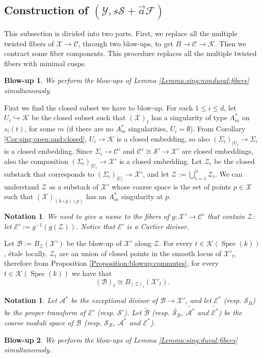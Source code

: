 \documentclass[11pt]{amsart}
\newcommand{\sC}{\mathscr{C}}
\newcommand{\sF}{\mathscr{F}}
\newcommand{\sA}{\mathscr{A}}
\newcommand{\sB}{\mathscr{B}}
\newcommand{\sE}{\mathscr{E}}
\newcommand{\sS}{\mathscr{S}}
\newcommand{\sX}{\mathscr{X}}
\newcommand{\sZ}{\mathscr{Z}}
\newcommand{\spec}{\operatorname{Spec}}
\newcommand{\Kg}{\mathcal{K}}
\newcommand{\sY}{\mathscr{Y}}
\newtheorem{Notation}[theorem]{Notation}
\newtheorem{Step_1}{Blow-up}
\theoremstyle{definition}
\begin{document}
\subsection{Construction of $(\sY,s\sS+\vec{a}\sF) $}\label{subsection:construction:family:of:surfaces} 
 This subsection is divided into two parts. First, we replace all the multiple twisted fibers of $\sX \to \sC$, through two
 blow-ups, to get $B \to \sC \to \Kg$. Then we contract some fiber components. This procedure replaces all the multiple twisted fibers with minimal cusps.
  
 \begin{Step_1}
  We perform the blow-ups of Lemma \ref{Lemma:sing:nonduval:fibers} simultaneously.
 \end{Step_1}

 First we find the closed subset we have to blow-up.
 For each $1 \le i \le d$, let $U_i \hookrightarrow \Kg$ be the closed subset such that $(\sX)_t$ has a singularity of type $A_m^*$ on $s_i(t)$,
 for some $m$ (if there are no $A_m^*$ singularities, $U_i=\emptyset$).
 From Corollary \ref{Cor:sing:open:and:closed},
 $U_i \to \Kg$ is a closed embedding, so also $(\Sigma_i)_{|U_i} \to \Sigma_i$ is a closed embedding. Since $\Sigma_i \to \sC'$ and
 $\sC' \cong \sS' \to \sX'$ are closed embeddings, also the composition $(\Sigma_i)_{|U_i} \to \sX'$ is a closed embedding. 
 Let $\mathscr{Z}_i$ be the closed substack that corresponds to $(\Sigma_i)_{|U_i} \to \sX'$,
 and let $\mathscr{Z}:=\bigcup _{i=1}^n \mathscr{Z}_i$. We can understand $\mathscr{Z}$
 as a substack of $\sX'$ whose coarse space is the set of points $p\in \sX$ such that $(\sX)_{(h\circ g)(p)}$ has an $A_m^*$ singularity at $p$.
  \begin{Notation}
  We need to give a name to the fibers of $g:\sX' \to \sC'$ that contain $\sZ$: let $\sE':=g^{-1}(g(\sZ))$. Notice that $\sE'$ is a Cartier divisor.
 \end{Notation}
Let $\sB:=B_{\sZ}(\sX')$ be the blow-up of $\sX'$ along $\sZ$. For every $t \in \Kg(\spec(k))$, étale locally,
$\sZ_t$ are an union of closed points in the smooth locus of $\sX'_t$, therefore from Proposition \ref{Proposition:blowup:commutes},
for every $t \in \Kg(\spec(k))$ we have that
$$(\sB)_{t} \cong B_{(\sZ)_{t}}(\sX'_t).$$
\begin{Notation} Let $\sA^*$ be the exceptional divisor of $\sB \to \sX'$, and let $\sE^*$ (resp. $\sS_B$) be the proper transform of $\sE'$ (resp. $\sS'$).
 Let $\widetilde{\sB}$ (resp. $\widetilde{\sS_{\sB}}$, $\widetilde{\sA^*}$ and $\widetilde{\sE^*}$)
be the coarse moduli space of $\sB$
(resp. $\sS_{\sB}$, $\sA^*$ and $\sE^*$). 
\end{Notation}
\begin{Step_1}
 We perform the blow-ups of Lemma \ref{Lemma:sing:duval:fibers} simultaneously.
\end{Step_1}
\end{document}
